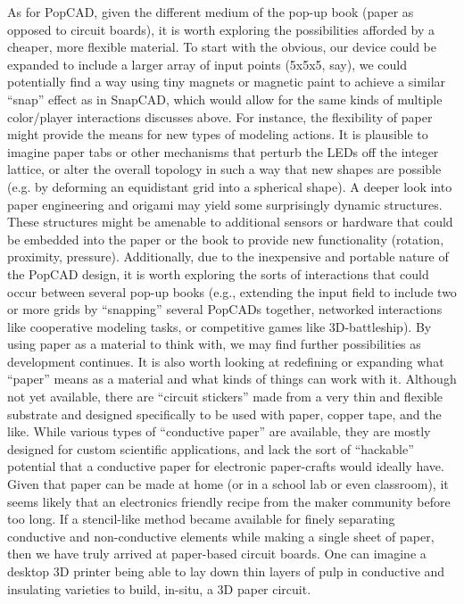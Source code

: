 As for PopCAD, given the different medium of the pop-up book (paper as opposed
to circuit boards), it is worth exploring the possibilities afforded by a
cheaper, more flexible material. To start with the obvious, our device could be
expanded to include a larger array of input points (5x5x5, say), we could
potentially find a way using tiny magnets or magnetic paint to achieve a similar
``snap'' effect as in SnapCAD, which would allow for the same kinds of multiple
color/player interactions discusses above. For instance, the flexibility of
paper might provide the means for new types of modeling actions. It is plausible
to imagine paper tabs or other mechanisms that perturb the LEDs off the integer
lattice, or alter the overall topology in such a way that new shapes are
possible (e.g. by deforming an equidistant grid into a spherical shape). A
deeper look into paper engineering and origami may yield some surprisingly
dynamic structures. These structures might be amenable to additional sensors or
hardware that could be embedded into the paper or the book to provide new
functionality (rotation, proximity, pressure). Additionally, due to the
inexpensive and portable nature of the PopCAD design, it is worth exploring the
sorts of interactions that could occur between several pop-up books (e.g.,
extending the input field to include two or more grids by ``snapping'' several
PopCADs together, networked interactions like cooperative modeling tasks, or
competitive games like 3D-battleship). By using paper as a material to think
with, we may find further possibilities as development continues. It is also
worth looking at redefining or expanding what ``paper'' means as a material and
what kinds of things can work with it. Although not yet available, there are
``circuit stickers'' made from a very thin and flexible substrate and designed
specifically to be used with paper, copper tape, and the like. While various
types of ``conductive paper'' are available, they are mostly designed for
custom scientific applications, and lack the sort of ``hackable'' potential that
a conductive paper for electronic paper-crafts would ideally have. Given that
paper can be made at home (or in a school lab or even classroom), it seems
likely that an electronics friendly recipe from the maker community before too
long. If a stencil-like method became available for finely separating conductive
and non-conductive elements while making a single sheet of paper, then we have
truly arrived at paper-based circuit boards. One can imagine a desktop 3D
printer being able to lay down thin layers of pulp in conductive and insulating
varieties to build, in-situ, a 3D paper circuit.


